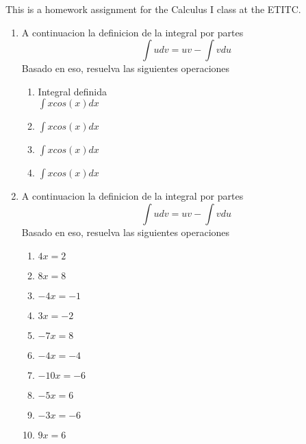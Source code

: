 \documentclass[12pt]{article}%
\begin{document}
%
\normalsize%
\pagestyle{header}%
This is a homework assignment for the Calculus I class at the ETITC.%
\begin{enumerate}[wide, labelwidth=!, labelindent=0pt,label={Question \arabic*. }]%
\item%
%
A continuacion la definicion de la integral por partes%
\[\int udv=uv-\int vdu\]%
Basado en eso, resuelva las siguientes operaciones%
\begin{enumerate}[wide, labelwidth=!, labelindent=0pt,label={\Alph*) }]%
\item%
%
Integral definida\\%
\(\int xcos(x)dx\)%
\item%
%
\(\int xcos(x)dx\)%
\item%
%
\(\int xcos(x)dx\)%
\item%
%
\(\int xcos(x)dx\)%
\end{enumerate}%
\item%
%
A continuacion la definicion de la integral por partes%
\[\int udv=uv-\int vdu\]%
Basado en eso, resuelva las siguientes operaciones%
\begin{enumerate}[wide, labelwidth=!, labelindent=0pt,label={\alph*) }]%
\item%
$\displaystyle 4 x = 2$%
\item%
$\displaystyle 8 x = 8$%
\item%
$\displaystyle - 4 x = -1$%
\item%
$\displaystyle 3 x = -2$%
\item%
$\displaystyle - 7 x = 8$%
\item%
$\displaystyle - 4 x = -4$%
\item%
$\displaystyle - 10 x = -6$%
\item%
$\displaystyle - 5 x = 6$%
\item%
$\displaystyle - 3 x = -6$%
\item%
$\displaystyle 9 x = 6$%
\end{enumerate}%
\end{enumerate}%
\end{document}

